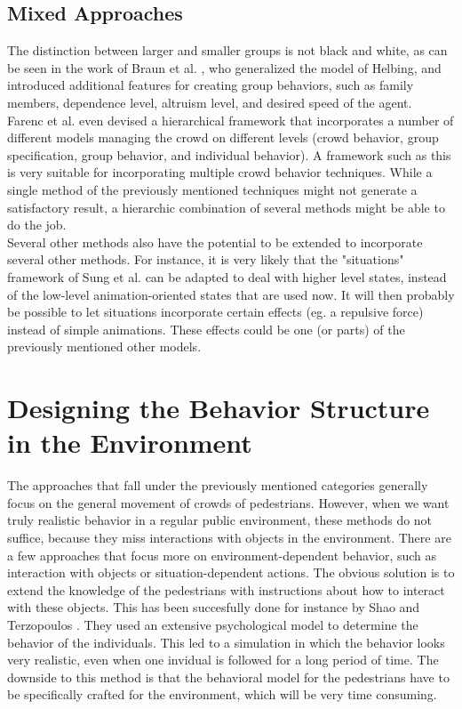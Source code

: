 \documentclass[11pt]{book}
\begin{document}
\subsection{Mixed Approaches}
The distinction between larger and smaller groups is not black and white, as can be seen in the work of Braun et al. \cite{10.1109CASA.2003.1199317}, who generalized the model of Helbing, and introduced additional features for creating group behaviors, such as family members, dependence level, altruism level, and desired speed of the agent.\\
Farenc et al. even devised a hierarchical framework that incorporates a number of different models managing the crowd on different levels (crowd behavior, group specification, group behavior, and individual behavior). A framework such as this is very suitable for incorporating multiple crowd behavior techniques. While a single method of the previously mentioned techniques might not generate a satisfactory result, a hierarchic combination of several methods might be able to do the job.\\
Several other methods also have the potential to be extended to incorporate several other methods. For instance, it is very likely that the "situations" framework of Sung et al. can be adapted to deal with higher level states, instead of the low-level animation-oriented states that are used now. It will then probably be possible to let situations incorporate certain effects (eg. a repulsive force) instead of simple animations. These effects could be one (or parts) of the previously mentioned other models.



\section{Designing the Behavior Structure in the Environment}
The approaches that fall under the previously mentioned categories generally focus on the general movement of crowds of pedestrians. However, when we want truly realistic behavior in a regular public environment, these methods do not suffice, because they miss interactions with objects in the environment. There are a few approaches that focus more on environment-dependent behavior, such as interaction with objects or situation-dependent actions.
The obvious solution is to extend the knowledge of the pedestrians with instructions about how to interact with these objects. This has been succesfully done for instance by Shao and Terzopoulos \cite{A_autonomouspedestrians}. They used an extensive psychological model to determine the behavior of the individuals. This led to a simulation in which the behavior looks very realistic, even when one invidual is followed for a long period of time. The downside to this method is that the behavioral model for the pedestrians have to be specifically crafted for the environment, which will be very time consuming.
\end{document}
